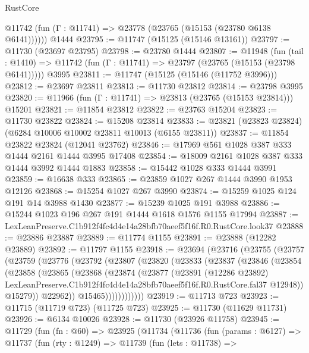 \begin{lexlean}{RustCore}
\begin{coremodule}
      @11742 (fun (Γ : @11741) => @23778 (@23765 (@15153 (@23780 @6138 @6141))))))
    @1444
@23795 := @11747 (@15125 (@15146 @13161))
@23797 := @11730 (@23697 @23795)
@23798 := @23780 @1444
@23807 := @11948
    (fun (tail : @1410) => @11742 (fun (Γ : @11741) => @23797 (@23765 (@15153 (@23798 @6141)))))
    @3995
@23811 := @11747 (@15125 (@15146 (@11752 @3996)))
@23812 := @23697 @23811
@23813 := @11730 @23812
@23814 := @23798 @3995
@23820 := @11966 (fun (Γ : @11741) => @23813 (@23765 (@15153 @23814))) @15201
@23821 := @11854 @23812
@23822 := @23763 @15204
@23823 := @11730 @23822
@23824 := @15208 @23814
@23833 := @23821 (@23823 @23824) (@6284 @10006 @10002 @23811 @10013 (@6155 @23811))
@23837 := @11854 @23822 @23824 (@12041 @23762)
@23846 := @17969 @561 @1028 @387 @333 @1444 @2161 @1444 @3995 @17408
@23854 := @18009 @2161 @1028 @387 @333 @1444 @3992 @1444 @1883
@23858 := @15442 @1028 @333 @1444 @3991
@23859 := @16638 @333
@23865 := @23859 @1027 @267 @1444 @3990 @1953 @12126
@23868 := @15254 @1027 @267 @3990
@23874 := @15259 @1025 @124 @191 @14 @3988 @1430
@23877 := @15239 @1025 @191 @3988
@23886 := @15244 @1023 @196 @267 @191 @1444 @1618 @1576 @1155 @17994
@23887 := LexLeanPreserve.C1b912f4fc4d4e14a28bfb70aeef5f16f.R0.RustCore.look37
@23888 := @23886 @23887
@23889 := @11774 @1155
@23891 := @23888 (@12282 @23889)
@23892 := @11797 @1155
@23918 := @23694
    (@23716
      (@23755
        (@23757
          (@23759
            (@23776
              (@23792
                (@23807
                  (@23820
                    (@23833
                      (@23837
                        (@23846
                          (@23854
                            (@23858
                              (@23865
                                (@23868
                                  (@23874
                                    (@23877
                                      (@23891
                                        (@12286 @23892)
                                        LexLeanPreserve.C1b912f4fc4d4e14a28bfb70aeef5f16f.R0.RustCore.fal37
                                        @12948))
                                    @15279))
                                @22962))
                            @15465))))))))))))
@23919 := @11713 @723
@23923 := @11715 (@11719 @723) (@11725 @723)
@23925 := @11730 (@11629 @11731)
@23926 := @6134 @10026
@23928 := @11730 (@23926 @11758)
@23945 := @11729
    (fun (fn : @60) =>
    @23925
      (@11734
        (@11736
          (fun (params : @6127) =>
          @11737
            (fun (rty : @1249) =>
            @11739
              (fun (lets : @11738) =>

\end{coremodule}
\end{lexlean}
